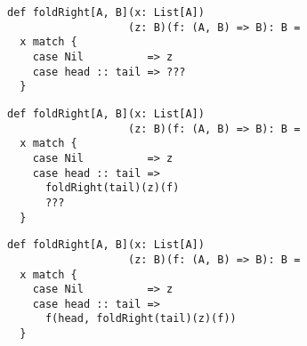 \documentclass[include/preamble.tex]{subfiles}
\begin{document}
\begin{frame}[fragile]
  \begin{center}
    \vspace{1em}
    \begin{lstlisting}[style=scala]
def foldRight[A, B](x: List[A])
                   (z: B)(f: (A, B) => B): B =
  x match {
    case Nil          => z
    case head :: tail => ???
  }
    \end{lstlisting}
  \end{center}
\end{frame}

\begin{frame}[fragile]
  \begin{center}
    \vspace{1em}
    \begin{lstlisting}[style=scala]
def foldRight[A, B](x: List[A])
                   (z: B)(f: (A, B) => B): B =
  x match {
    case Nil          => z
    case head :: tail =>
      foldRight(tail)(z)(f)
      ???
  }
    \end{lstlisting}
  \end{center}
\end{frame}

\begin{frame}[fragile]
  \begin{center}
    \vspace{1em}
    \begin{lstlisting}[style=scala]
def foldRight[A, B](x: List[A])
                   (z: B)(f: (A, B) => B): B =
  x match {
    case Nil          => z
    case head :: tail =>
      f(head, foldRight(tail)(z)(f))
  }
    \end{lstlisting}
  \end{center}
\end{frame}
\end{document}
